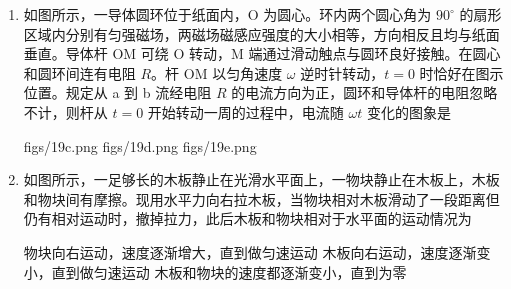 \documentclass[\gkver]{gaokaozhenti}
\begin{document}
\begin{enumerate}
{$\frac{\sqrt{3}}{2}\UV$}
{$\frac{1}{4}\UV$}
{$\frac{3}{4}\UV$}


\item
如图所示，一导体圆环位于纸面内，O 为圆心。环内两个圆心角为 $90^{\circ}$ 的扇形区域内分别有匀强磁场，两磁场磁感应强度的大小相等，方向相反且均与纸面垂直。导体杆 OM 可绕 O 转动，M 端通过滑动触点与圆环良好接触。在圆心和圆环间连有电阻 $R$。杆 OM 以匀角速度 $\omega$ 逆时针转动，$t=0$ 时恰好在图示位置。规定从 a 到 b 流经电阻 $R$ 的电流方向为正，圆环和导体杆的电阻忽略不计，则杆从 $t=0$ 开始转动一周的过程中，电流随 $\omega t$ 变化的图象是


{figs/19c.png}
{figs/19d.png}
{figs/19e.png}


\item
如图所示，一足够长的木板静止在光滑水平面上，一物块静止在木板上，木板和物块间有摩擦。现用水平力向右拉木板，当物块相对木板滑动了一段距离但仍有相对运动时，撤掉拉力，此后木板和物块相对于水平面的运动情况为


{物块向右运动，速度逐渐增大，直到做匀速运动}
{木板向右运动，速度逐渐变小，直到做匀速运动}
{木板和物块的速度都逐渐变小，直到为零}


\end{enumerate}
\end{document}
